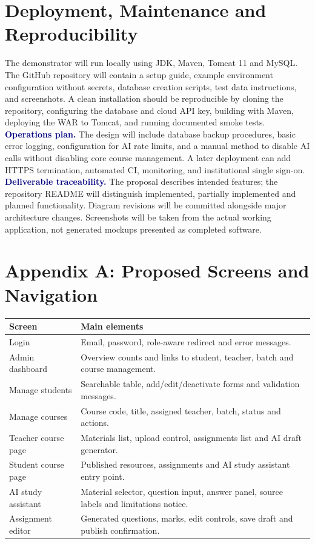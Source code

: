\documentclass[11pt,a4paper]{article}
\newcommand{\heading}[1]{\vspace{5pt}\textcolor{navy}{\textbf{#1}}}
\begin{document}
\section{Deployment, Maintenance and Reproducibility}
The demonstrator will run locally using JDK, Maven, Tomcat 11 and MySQL. The GitHub repository will contain a setup guide, example environment configuration without secrets, database creation scripts, test data instructions, and screenshots. A clean installation should be reproducible by cloning the repository, configuring the database and cloud API key, building with Maven, deploying the WAR to Tomcat, and running documented smoke tests.
\heading{Operations plan.} The design will include database backup procedures, basic error logging, configuration for AI rate limits, and a manual method to disable AI calls without disabling core course management. A later deployment can add HTTPS termination, automated CI, monitoring, and institutional single sign-on.
\heading{Deliverable traceability.} The proposal describes intended features; the repository README will distinguish implemented, partially implemented and planned functionality. Diagram revisions will be committed alongside major architecture changes. Screenshots will be taken from the actual working application, not generated mockups presented as completed software.

\section{Appendix A: Proposed Screens and Navigation}
\begin{longtable}{p{}p{}}
\toprule Screen & Main elements\\\midrule\endhead
Login & Email, password, role-aware redirect and error messages.\\
Admin dashboard & Overview counts and links to student, teacher, batch and course management.\\
Manage students & Searchable table, add/edit/deactivate forms and validation messages.\\
Manage courses & Course code, title, assigned teacher, batch, status and actions.\\
Teacher course page & Materials list, upload control, assignments list and AI draft generator.\\
Student course page & Published resources, assignments and AI study assistant entry point.\\
AI study assistant & Material selector, question input, answer panel, source labels and limitations notice.\\
Assignment editor & Generated questions, marks, edit controls, save draft and publish confirmation.\\
\bottomrule
\end{longtable}
\end{document}
